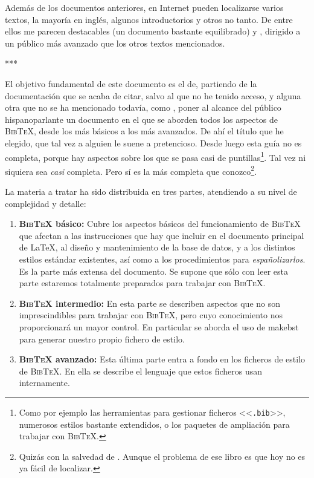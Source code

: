 \documentclass[a4paper,11pt]{article}
\def\btx-{\textsc{Bib\TeX}}
\def\ltx-{\LaTeX}
\def\ltr#1-{<<\texttt{#1}>>}
\def\tpf#1-{\ltr.#1-}
\begin{document}
Además  de los documentos  anteriores, en  Internet pueden  localizarse varios
textos, la  mayoría en  inglés, algunos introductorios  y otros no  tanto.  De
entre  ellos  me parecen  destacables  \cite{young02}  (un documento  bastante
equilibrado) y  \cite{markey05}, dirigido  a un público  más avanzado  que los
otros textos mencionados.

\begin{center}***\end{center}

El  objetivo  fundamental  de  este  documento  es  el  de,  partiendo  de  la
documentación  que se  acaba de  citar, salvo  \cite{lamport86} al  que  no he
tenido  acceso,  y  alguna  otra   que  no  se  ha  mencionado  todavía,  como
\cite{kopla}, poner al alcance del  público hispanoparlante un documento en el
que se aborden  todos los aspectos de  \btx-, desde los más básicos  a los más
avanzados. De ahí el  título que he elegido, que tal vez  a alguien le suene a
pretencioso.  Desde luego esta guía  no es completa, porque hay aspectos sobre
los que se  pasa casi de puntillas\footnote{Como por  ejemplo las herramientas
  para gestionar ficheros \tpf  bib-, numerosos estilos bastante extendidos, o
  los paquetes de  ampliación para trabajar con \btx-.}.   Tal vez ni siquiera
sea   \emph{casi}    completa.    Pero   sí    es   la   más    completa   que
conozco\footnote{Quizás  con  la  salvedad  de \cite{cascales00}.   Aunque  el
  problema de ese libro es que hoy no es ya fácil de localizar.}.

La materia a tratar ha sido  distribuida en tres partes, atendiendo a su nivel
de complejidad y detalle:

\begin{enumerate}

\item \textbf{\btx- básico:} Cubre  los aspectos básicos del funcionamiento de
  \btx- que  afectan a las instrucciones  que hay que incluir  en el documento
  principal de \ltx-, al  diseño y mantenimiento de la base de  datos, y a los
  distintos estilos  estándar existentes, así  como a los  procedimientos para
  \emph{españolizarlos}. Es la parte más  extensa del documento. Se supone que
  sólo con leer  esta parte estaremos totalmente preparados  para trabajar con
  \btx-.

\item \textbf{\btx-  intermedio:} En esta  parte se describen aspectos  que no
  son  imprescindibles para  trabajar con  \btx-, pero  cuyo  conocimiento nos
  proporcionará un  mayor control. En particular  se aborda el  uso de makebst
  para generar nuestro propio fichero de estilo.

\item \textbf{\btx- avanzado:} Esta última parte entra a fondo en los ficheros
  de estilo de \btx-. En ella  se describe el lenguaje que estos ficheros usan
  internamente.

\end{enumerate}
\end{document}
